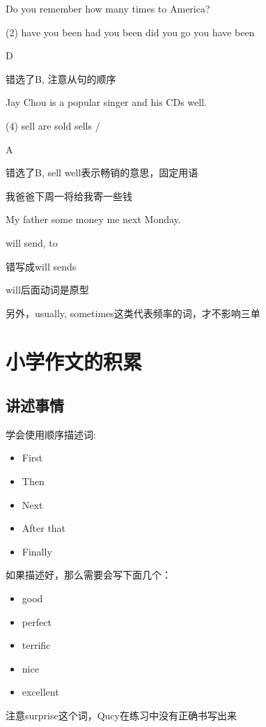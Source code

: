 \begin{question}[tags={xiaoxuect}]
Do you remember how many times \blank[width=1cm]{} to America?

  \begin{tasks}(2)
    \task have you been
    \task had you been
    \task did you go
    \task you have been
  \end{tasks}

\end{question}
\begin{solution}
D

错选了B, 注意从句的顺序
\end{solution}


\begin{question}[tags={xiaoxuect}]
Jay Chou is a popular singer and his CDs \blank[width=1cm]{} well.

  \begin{tasks}(4)
    \task sell
    \task are sold
    \task sells
    \task /
  \end{tasks}

\end{question}
\begin{solution}
A

错选了B, sell well表示畅销的意思，固定用语
\end{solution}

\begin{question}[tags={xiaoxuect}]

\noindent 我爸爸下周一将给我寄一些钱

\noindent My father \blank*[width=1.4cm]{} \blank[width=1.4cm]{} some money \blank[width=1.4cm]{} me next Monday.

\end{question}
\begin{solution}
will send, to

错写成will sends

will后面动词是原型

另外，usually, sometimes这类代表频率的词，才不影响三单
\end{solution}

\section{小学作文的积累}

  \subsection{讲述事情}
学会使用顺序描述词:

\begin{itemize}
    \item First
    \item Then
    \item Next
    \item After that
    \item Finally
\end{itemize}

如果描述好，那么需要会写下面几个：

\begin{itemize}
    \item good
    \item perfect
    \item terrific
    \item nice
    \item excellent
\end{itemize}

注意surprise这个词，Qucy在练习中没有正确书写出来
